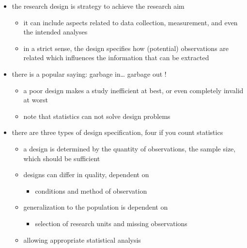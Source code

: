 \documentclass[]{article}
\providecommand{\tightlist}{%
  \setlength{\itemsep}{0pt}\setlength{\parskip}{0pt}}
\begin{document}
\begin{itemize}
\tightlist
\item
  the research design is strategy to achieve the research aim

  \begin{itemize}
  \tightlist
  \item
    it can include aspects related to data collection, measurement, and
    even the intended analyses
  \item
    in a strict sense, the design specifies how (potential) observations
    are related which influences the information that can be extracted
    \\
  \end{itemize}
\item
  there is a popular saying: garbage in\ldots{} garbage out !

  \begin{itemize}
  \tightlist
  \item
    a poor design makes a study inefficient at best, or even completely
    invalid at worst
  \item
    note that statistics can not solve design problems\\
  \end{itemize}
\item
  there are three types of design specification, four if you count
  statistics

  \begin{itemize}
  \tightlist
  \item
    a design is determined by the quantity of observations, the sample
    size, which should be sufficient
  \item
    designs can differ in quality, dependent on

    \begin{itemize}
    \tightlist
    \item
      conditions and method of observation
    \end{itemize}
  \item
    generalization to the population is dependent on

    \begin{itemize}
    \tightlist
    \item
      selection of research units and missing observations
    \end{itemize}
  \item
    allowing appropriate statistical analysis
  \end{itemize}
\end{itemize}
\end{document}
